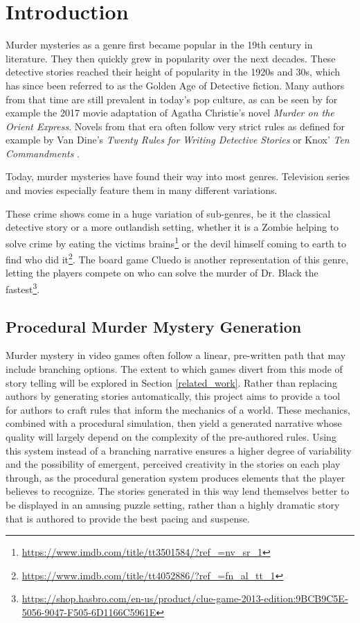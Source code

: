 \section{Introduction} \label{introduction}

Murder mysteries as a genre first became popular in the 19th century in literature.
They then quickly grew in popularity over the next decades.
These detective stories reached their height of popularity in the 1920s and 30s, which has since been referred to as the Golden Age of Detective fiction.
Many authors from that time are still prevalent in today's pop culture, as can be seen by for example the 2017 movie adaptation of Agatha Christie's novel \emph{Murder on the Orient Express}.
Novels from that era often follow very strict rules as defined for example by Van Dine's \emph{Twenty Rules for Writing Detective Stories} \cite{van_dine_1928} or Knox' \emph{Ten Commandments} \cite{knox_1929}.

Today, murder mysteries have found their way into most genres.
Television series and movies especially feature them in many different variations.

These crime shows come in a huge variation of sub-genres, be it the classical detective story or a more outlandish setting, whether it is a Zombie helping to solve crime by eating the victims brains\footnote{\url{https://www.imdb.com/title/tt3501584/?ref_=nv_sr_1}} or the devil himself coming to earth to find who did it\footnote{\url{https://www.imdb.com/title/tt4052886/?ref_=fn_al_tt_1}}.
The board game Cluedo is another representation of this genre, letting the players compete on who can solve the murder of Dr. Black the fastest\footnote{\url{https://shop.hasbro.com/en-us/product/clue-game-2013-edition:9BCB9C5E-5056-9047-F505-6D1166C5961E}}.

\subsection{Procedural Murder Mystery Generation}
Murder mystery in video games often follow a linear, pre-written path that may include branching options.
The extent to which games divert from this mode of story telling will be explored in Section \ref{related_work}.
Rather than replacing authors by generating stories automatically, this project aims to provide a tool for authors to craft rules that inform the mechanics of a world.
These mechanics, combined with a procedural simulation, then yield a generated narrative whose quality will largely depend on the complexity of the pre-authored rules.
Using this system instead of a branching narrative ensures a higher degree of variability and the possibility of emergent, perceived creativity in the stories on each play through, as the procedural generation system produces elements that the player believes to recognize.
The stories generated in this way lend themselves better to be displayed in an amusing puzzle setting, rather than a highly dramatic story that is authored to provide the best pacing and suspense.

